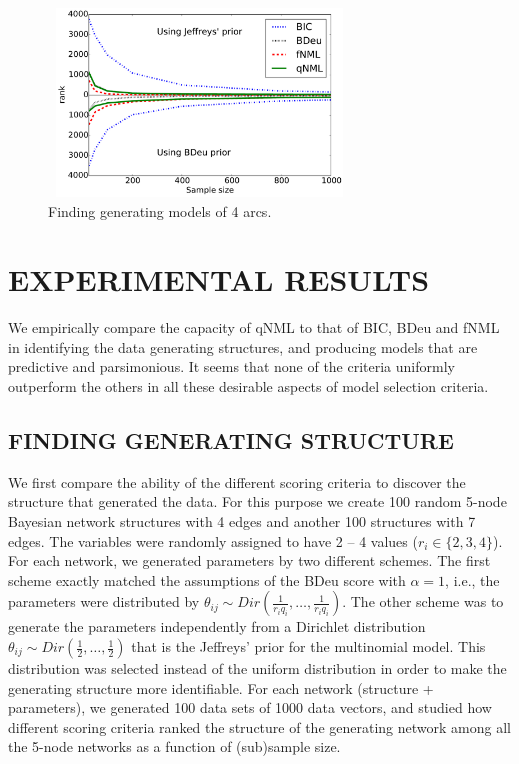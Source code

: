 \begin{figure}[h]
\centering
\includegraphics[width=8cm,height=5cm]{qNML_images/art4_mean.pdf}
\caption{Finding generating models of 4 arcs.}
\label{fig:4arcs}
\end{figure}

\section{EXPERIMENTAL RESULTS}

We empirically compare the capacity of qNML to that of BIC, BDeu and
fNML in identifying the data generating structures, and producing
models that are predictive and parsimonious.  It seems that none of
the criteria uniformly outperform the others in all these desirable
aspects of model selection criteria.

\subsection{FINDING GENERATING STRUCTURE}

We first compare the ability of the different scoring criteria to
discover the structure that generated the data. For this purpose we
create 100 random 5-node Bayesian network structures with 4
edges and another 100 structures with 7 edges.  The variables were
randomly assigned to have 2 -- 4 values ($r_i \in \{2, 3, 4\}$). For
each network, we generated parameters by two different schemes. The
first scheme exactly matched the assumptions of the BDeu score with
$\alpha = 1$, i.e., the parameters were distributed by $\theta_{ij}
\sim Dir(\frac{1}{r_iq_i},\ldots,\frac{1}{r_iq_i})$. The other scheme
was to generate the parameters independently from a Dirichlet
distribution $\theta_{ij} \sim Dir(\frac{1}{2},\ldots, \frac{1}{2})$
that is the Jeffreys' prior for the multinomial model. This distribution
was selected instead of the uniform distribution in order to make the
generating structure more identifiable.  For each network (structure +
parameters), we generated 100 data sets of 1000 data vectors, and
studied how different scoring criteria ranked the structure of the
generating network among all the 5-node networks as a function of
(sub)sample size.

